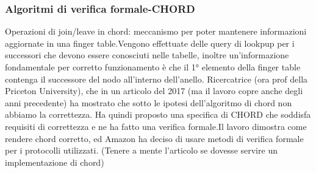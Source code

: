 \documentclass{article}
\begin{document}
\subsubsection{Algoritmi di verifica formale-CHORD}
Operazioni di join/leave in chord: meccanismo per poter mantenere informazioni aggiornate in una finger table.Vengono effettuate delle query di lookpup per i successori che devono essere conosciuti nelle tabelle, inoltre un'informazione fondamentale per corretto funzionamento è che il 1° elemento della finger table contenga il successore del nodo all'interno dell'anello. Ricercatrice (ora prof della Priceton University), che in un articolo del 2017 (ma il lavoro copre anche degli anni precedente) ha mostrato che sotto le ipotesi dell'algoritmo di chord non abbiamo la correttezza. Ha quindi proposto una specifica di CHORD che soddisfa requisiti di correttezza e ne ha fatto una verifica formale.Il lavoro dimostra come rendere chord corretto, ed Amazon ha deciso di usare metodi di verifica formale per i protocolli utilizzati.
(Tenere a mente l'articolo se dovesse servire un implementazione di chord)
\end{document}
